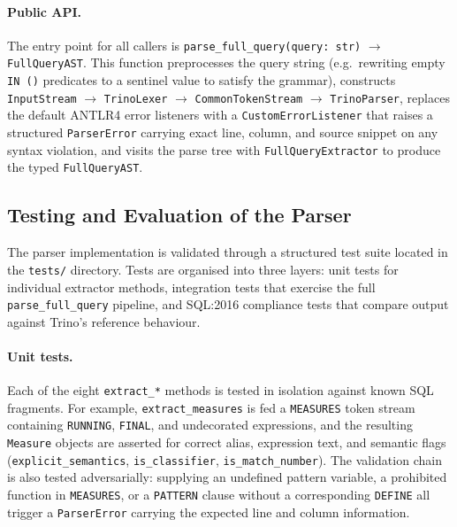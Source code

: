 \paragraph{Public API.}
The entry point for all callers is
\texttt{parse\_full\_query(query:~str)} $\to$ \texttt{FullQueryAST}.
This function preprocesses the query string
(e.g.\ rewriting empty \texttt{IN~()} predicates to a sentinel value
to satisfy the grammar), constructs
\texttt{InputStream} $\to$ \texttt{TrinoLexer} $\to$ \texttt{CommonTokenStream} $\to$ \texttt{TrinoParser},
replaces the default ANTLR4 error listeners with a
\texttt{CustomErrorListener} that raises a structured
\texttt{ParserError} carrying exact line, column, and source snippet
on any syntax violation, and visits the parse tree with
\texttt{FullQueryExtractor} to produce the typed \texttt{FullQueryAST}.

\subsection{Testing and Evaluation of the Parser}
\label{subsec:meth-parser-testing}

The parser implementation is validated through a structured test
suite located in the \texttt{tests/} directory.  Tests are organised
into three layers: unit tests for individual extractor methods,
integration tests that exercise the full
\texttt{parse\_full\_query} pipeline, and
SQL:2016 compliance tests that compare output against Trino's
reference behaviour.

\paragraph{Unit tests.}
Each of the eight \texttt{extract\_*} methods is tested in isolation
against known SQL fragments.  For example, \texttt{extract\_measures}
is fed a \texttt{MEASURES} token stream containing \texttt{RUNNING},
\texttt{FINAL}, and undecorated expressions, and the resulting
\texttt{Measure} objects are asserted for correct alias, expression
text, and semantic flags (\texttt{explicit\_semantics},
\texttt{is\_classifier}, \texttt{is\_match\_number}).
The validation chain is also tested adversarially: supplying an
undefined pattern variable, a prohibited function in \texttt{MEASURES},
or a \texttt{PATTERN} clause without a corresponding \texttt{DEFINE}
all trigger a \texttt{ParserError} carrying the expected
line and column information.

